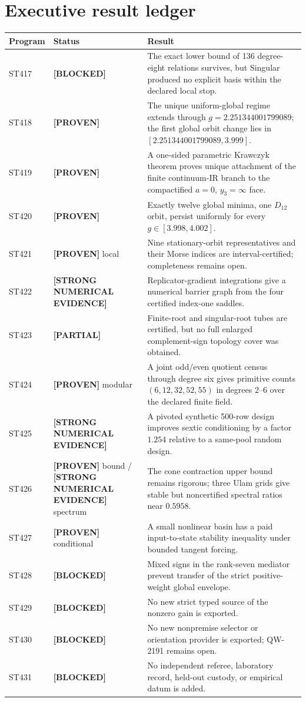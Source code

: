 \documentclass[11pt,a4paper]{article}
\newcommand{\Proven}{\textcolor{green!38!black}{\textbf{[PROVEN]}}}
\newcommand{\Evidence}{\textcolor{orange!80!black}{\textbf{[STRONG NUMERICAL EVIDENCE]}}}
\newcommand{\Partial}{\textcolor{orange!80!black}{\textbf{[PARTIAL]}}}
\newcommand{\Blocked}{\textcolor{red!65!black}{\textbf{[BLOCKED]}}}
\begin{document}
\section{Executive result ledger}
\small
\begin{longtable}{>{\raggedright\arraybackslash}p{}>{\raggedright\arraybackslash}p{}>{\raggedright\arraybackslash}p{}}
\toprule Program&Status&Result\\\midrule\endhead
ST417&\Blocked&The exact lower bound of 136 degree-eight relations survives, but Singular produced no explicit basis within the declared local stop.\\
ST418&\Proven&The unique uniform-global regime extends through $g=2.251344001799089$; the first global orbit change lies in $[2.251344001799089,3.999]$.\\
ST419&\Proven&A one-sided parametric Krawczyk theorem proves unique attachment of the finite continuum-IR branch to the compactified $a=0$, $y_3=\infty$ face.\\
ST420&\Proven&Exactly twelve global minima, one $D_{12}$ orbit, persist uniformly for every $g\in[3.998,4.002]$.\\
ST421&\Proven{} local&Nine stationary-orbit representatives and their Morse indices are interval-certified; completeness remains open.\\
ST422&\Evidence&Replicator-gradient integrations give a numerical barrier graph from the four certified index-one saddles.\\
ST423&\Partial&Finite-root and singular-root tubes are certified, but no full enlarged complement-sign topology cover was obtained.\\
ST424&\Proven{} modular&A joint odd/even quotient census through degree six gives primitive counts $(6,12,32,52,55)$ in degrees $2$--$6$ over the declared finite field.\\
ST425&\Evidence&A pivoted synthetic 500-row design improves sextic conditioning by a factor $1.254$ relative to a same-pool random design.\\
ST426&\Proven{} bound / \Evidence{} spectrum&The cone contraction upper bound remains rigorous; three Ulam grids give stable but noncertified spectral ratios near $0.5958$.\\
ST427&\Proven{} conditional&A small nonlinear basin has a paid input-to-state stability inequality under bounded tangent forcing.\\
ST428&\Blocked&Mixed signs in the rank-seven mediator prevent transfer of the strict positive-weight global envelope.\\
ST429&\Blocked&No new strict typed source of the nonzero gain is exported.\\
ST430&\Blocked&No new nonpremise selector or orientation provider is exported; QW-2191 remains open.\\
ST431&\Blocked&No independent referee, laboratory record, held-out custody, or empirical datum is added.\\
\bottomrule
\end{longtable}
\normalsize
\end{document}
